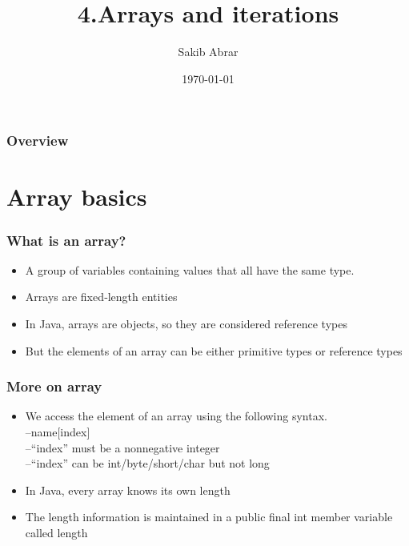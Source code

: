 \documentclass{beamer}
\title[Arrays \& Iterations]{4.Arrays and iterations} %
\author{Sakib Abrar} %
\institute[BUET] %
{
CSE\\~\\Bangladesh University of Engineering \& Technology \\ %
\medskip
\textit{sakib.cghs@gmail.com} %
}
\date{\today} %
\begin{document}
\begin{frame}
\titlepage %
\end{frame}

\begin{frame}
\frametitle{Overview} %
\tableofcontents %
\end{frame}


\section{Array basics}

\begin{frame}
\frametitle{What is an array?}
\begin{itemize}
\item A group of variables containing values that all have the same type.
\item Arrays are fixed‐length entities
\item In Java, arrays are objects, so they are considered reference types
\item But the elements of an array can be either primitive types or reference types
\end{itemize}
\end{frame}



\begin{frame}
\frametitle{More on array}
\begin{itemize}
\item We access the element of an array using the following syntax.\\
–name[index]\\
–“index” must be a nonnegative integer\\
–“index” can be int/byte/short/char but not long\\
\item In Java, every array knows its own length\\
\item The length information is maintained in a public final int member variable called length\\
\end{itemize}
\end{frame}
\end{document}
